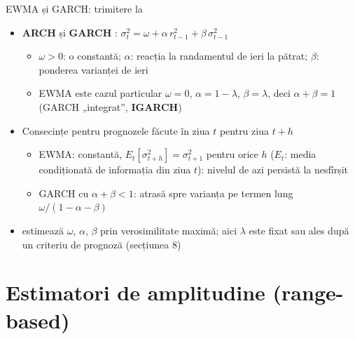 \begin{frame}{EWMA și GARCH: trimitere la }
\itemsize{\small}
\begin{itemize}
    \item \textbf{ARCH}  și \textbf{GARCH} : $\sigma_t^2 = \omega + \alpha\, r_{t-1}^2 + \beta\,\sigma_{t-1}^2$
    \begin{itemize}
        \item $\omega > 0$: o constantă; $\alpha$: reacția la randamentul de ieri la pătrat; $\beta$: ponderea varianței de ieri
        \item EWMA este cazul particular $\omega = 0$, $\alpha = 1 - \lambda$, $\beta = \lambda$, deci $\alpha + \beta = 1$ (GARCH „integrat”, \textbf{IGARCH})
    \end{itemize}
    \item Consecințe pentru prognozele făcute în ziua $t$ pentru ziua $t + h$
    \begin{itemize}
        \item EWMA: constantă, $E_t[\sigma_{t+h}^2] = \sigma_{t+1}^2$ pentru orice $h$ ($E_t$: media condiționată de informația din ziua $t$): nivelul de azi persistă la nesfîrșit
        \item GARCH cu $\alpha + \beta < 1$: atrasă spre varianța pe termen lung $\omega/(1 - \alpha - \beta)$
    \end{itemize}
    \item {} estimează $\omega$, $\alpha$, $\beta$ prin verosimilitate maximă; aici $\lambda$ este fixat sau ales după un criteriu de prognoză (secțiunea 8)
\end{itemize}
\end{frame}


\section{Estimatori de amplitudine (range-based)}

